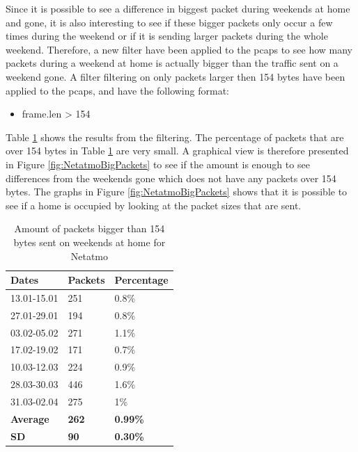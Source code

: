 Since it is possible to see a difference in biggest packet during weekends at home and gone, it is also interesting to see if these bigger packets only occur a few times during the weekend or if it is sending larger packets during the whole weekend. Therefore, a new filter have been applied to the pcaps to see how many packets during a weekend at home is actually bigger than the traffic sent on a weekend gone. A filter filtering on only packets larger then 154 bytes have been applied to the pcaps, and have the following format:

\begin{itemize}
    \item frame.len > 154
\end{itemize}

Table \ref{tab:NetatmoBigPackets} shows the results from the filtering. The percentage of packets that are over 154 bytes in Table \ref{tab:NetatmoBigPackets} are very small. A graphical view is therefore presented in Figure \ref{fig:NetatmoBigPackets} to see if the amount is enough to see differences from the weekends gone which does not have any packets over 154 bytes. The graphs in Figure \ref{fig:NetatmoBigPackets} shows that it is possible to see if a home is occupied by looking at the packet sizes that are sent. 

\begin{table}[H]
    \centering
    \caption{Amount of packets bigger than 154 bytes sent on weekends at home for Netatmo}
    \begin{tabular}{|l|l|l|}
        \hline
        \textbf{Dates}   & \textbf{Packets} & \textbf{Percentage} \\ \hline
        13.01-15.01      & 251              & 0.8\%               \\ \hline
        27.01-29.01      & 194              & 0.8\%               \\ \hline
        03.02-05.02      & 271              & 1.1\%               \\ \hline
        17.02-19.02      & 171              & 0.7\%               \\ \hline
        10.03-12.03      & 224              & 0.9\%               \\ \hline
        28.03-30.03      & 446              & 1.6\%               \\ \hline
        31.03-02.04      & 275              & 1\%                 \\ \hline
        \textbf{Average} & \textbf{262}     & \textbf{0.99\%}     \\ \hline
        \textbf{\gls{SD}} & \textbf{90}      & \textbf{0.30\%}     \\ \hline
    \end{tabular}
    \label{tab:NetatmoBigPackets}
\end{table}

